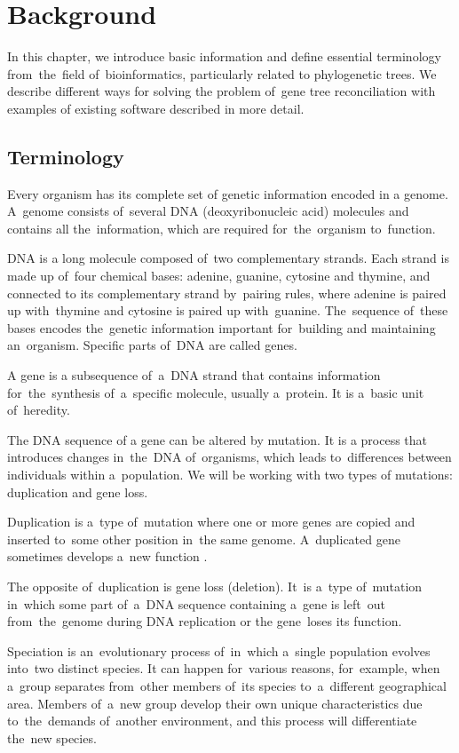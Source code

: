 \chapter{Background}
In this chapter, we introduce basic information and define essential terminology from~the~field of~bioinformatics, particularly related to phylogenetic trees. We describe different ways for solving the problem of~gene tree reconciliation with examples of existing software described in more detail.

\section{Terminology}
Every organism has its complete set of genetic information encoded in a genome. A~genome consists of~several DNA (deoxyribonucleic acid) molecules and contains all the~information, which are required for~the~organism to~function.

DNA is a long molecule composed of~two complementary strands. Each strand is made up of~four chemical bases: adenine, guanine, cytosine and thymine, and connected to its complementary strand by~pairing rules, where adenine is paired up with~thymine and cytosine is paired up with~guanine. The~sequence of~these bases encodes the~genetic information important for~building and maintaining an~organism. Specific parts of~DNA are called genes.

A gene is a subsequence of~a~DNA strand that contains information for~the~synthesis of~a~specific molecule, usually a~protein. It is a~basic unit of~heredity.

The DNA sequence of a gene can be altered by mutation. It is a process that introduces changes in~the~DNA of~organisms, which leads to~differences between individuals within a~population. We will be working with two types of mutations: duplication and gene loss.

Duplication is a~type of~mutation where one or more genes are copied and inserted to~some other position in~the same genome. A~duplicated gene sometimes develops a~new function \cite{doyon}. 

The opposite of~duplication is gene loss (deletion). It~is a~type of~mutation in~which some part of~a~DNA sequence containing a~gene is left~out from~the~genome during DNA replication or the gene~loses its function. 

Speciation is an~evolutionary process of~in~which a~single population evolves into~two distinct species. It can happen for~various reasons, for~example, when a~group separates from~other members of~its species to~a~different geographical area. Members of~a~new group develop their own unique characteristics due to~the~demands of~another environment, and this process will differentiate the~new species.

